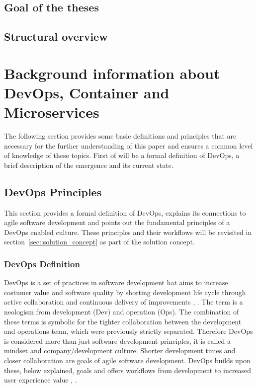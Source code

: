 \documentclass[12pt, a4paper]{article}
\begin{document}
    \subsection{Goal of the theses}
    \subsection{Structural overview}
    \newpage
\section{Background information about DevOps, Container and Microservices}\label{sec::backgrund}
The following section provides some basic definitions and principles that are necessary for the further understanding of this paper and ensures a common level of knowledge of these topics.\newline
First of will be a formal definition of DevOps, a brief description of the emergence and its current state.
    \subsection{DevOps Principles}\label{ssec::devops}
    This section provides a formal definition of DevOps, explains its connections to agile software development and points out the fundamental principles of a DevOps enabled culture. These principles and their workflows will be revisited in section~\ref{sec::solution_concept} as part of the solution concept.
        \subsubsection{DevOps Definition}
        DevOps is a set of practices in software development hat aims to increase costumer value and software quality by shorting development life cycle through active collaboration and continuous delivery of improvements \cite{base_devops}, \cite{effective_devops}. The term  is a neologism from development (Dev) and operation (Ops). The combination of these terms is symbolic for the tighter collaboration between the development and operations team, which were previously strictly separated. Therefore DevOps is considered more than just software development principles, it is called a mindset and company/development culture. Shorter development times and closer collaboration are goals of agile software development. DevOps builds upon these, below explained, goals and offers workflows from development to increased user experience value \cite{azuredevops}, \cite{effective_devops}.
\end{document}

